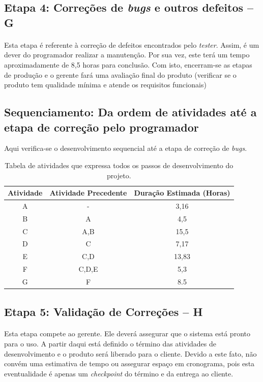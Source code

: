 \documentclass[12pt,a4paper]{article}
\begin{document}
		
		\subsection{Etapa 4: Correções de \textit{bugs} e outros defeitos -- G}
		\paragraph{} Esta etapa é referente à correção de defeitos encontrados pelo \textit{tester}. Assim, é um dever do programador realizar a manutenção. Por sua vez, este terá um tempo aproximadamente de 8,5 horas para conclusão.	Com isto, encerram-se as etapas de produção e o gerente fará uma avaliação final do produto (verificar se o produto tem qualidade mínima e atende os requisitos funcionais)
		\subsection{Sequenciamento: Da ordem de atividades até a etapa de correção pelo programador}
		Aqui verifica-se o desenvolvimento sequencial até a etapa de correção de \textit{bugs}.
		\begin{table}[!ht]
		\centering
        \begin{tabular}{|c|c|c|}
        \hline 
        Atividade & Atividade Precedente & Duração Estimada (Horas) \\ 
		 \hline 
		A & - & 3,16 \\ 
		\hline 
		B & A & 4,5 \\         
        \hline 
        C & A,B & 15,5 \\ 
        \hline 
        D & C & 7,17 \\ 
        \hline 
        E & C,D & 13,83 \\ 
        \hline 	
        F & C,D,E &  5,3 \\
        \hline
        G & F & 8.5 \\
        \hline
        
        \end{tabular}	
        \caption{Tabela de atividades que expressa todos os passos de desenvolvimento do projeto.}
		\end{table}
		\subsection{Etapa 5: Validação de Correções -- H}
		\paragraph{} Esta etapa compete ao gerente. Ele deverá assegurar que o sistema está pronto para o uso. A partir daqui está definido o término das atividades de desenvolvimento e o produto será liberado para o cliente. Devido a este fato, não convém uma estimativa de tempo ou assegurar espaço em cronograma, pois esta eventualidade é apenas um \textit{checkpoint} do término e da entrega ao cliente.
\end{document}
